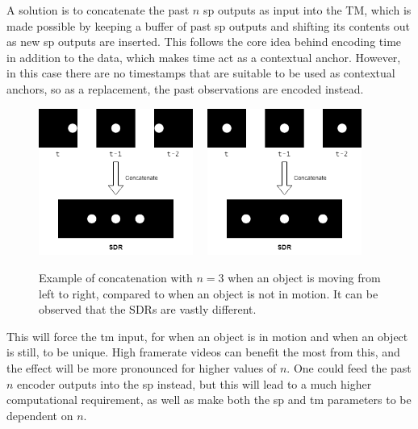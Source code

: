 A solution is to concatenate the past $n$ \gls*{sp} outputs as input into the TM, which is made possible by keeping a buffer of past \gls*{sp} outputs and shifting its contents out as new \gls*{sp} outputs are inserted. This follows the core idea behind encoding time in addition to the data, which makes time act as a contextual anchor. However, in this case there are no timestamps that are suitable to be used as contextual anchors, so as a replacement, the past observations are encoded instead.
\par

\begin{figure}[H]
    \centering
    \includegraphics[width=0.45\textwidth]{resources/methodology/temporal_concatenation.png}
    \unskip\ \vrule\
    \includegraphics[width=0.45\textwidth]{resources/methodology/temporal_concatenation_still.png}
    \caption{Example of concatenation with $n=3$ when an object is moving from left to right, compared to when an object is not in motion. It can be observed that the SDRs are vastly different.}
\end{figure}
This will force the \gls*{tm} input, for when an object is in motion and when an object is still, to be unique. High framerate videos can benefit the most from this, and the effect will be more pronounced for higher values of $n$. One could feed the past $n$ encoder outputs into the \gls*{sp} instead, but this will lead to a much higher computational requirement, as well as make both the \gls*{sp} and \gls*{tm} parameters to be dependent on $n$.
